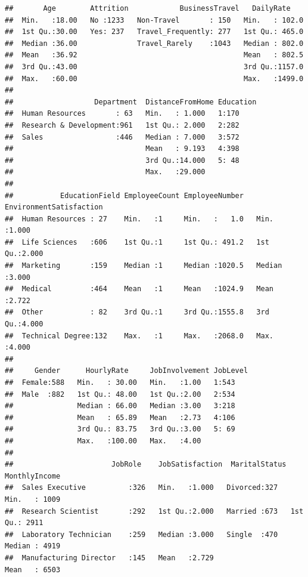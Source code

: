 \documentclass[
]{article}
\begin{document}
\begin{verbatim}
##       Age        Attrition            BusinessTravel   DailyRate     
##  Min.   :18.00   No :1233   Non-Travel       : 150   Min.   : 102.0  
##  1st Qu.:30.00   Yes: 237   Travel_Frequently: 277   1st Qu.: 465.0  
##  Median :36.00              Travel_Rarely    :1043   Median : 802.0  
##  Mean   :36.92                                       Mean   : 802.5  
##  3rd Qu.:43.00                                       3rd Qu.:1157.0  
##  Max.   :60.00                                       Max.   :1499.0  
##                                                                      
##                   Department  DistanceFromHome Education
##  Human Resources       : 63   Min.   : 1.000   1:170    
##  Research & Development:961   1st Qu.: 2.000   2:282    
##  Sales                 :446   Median : 7.000   3:572    
##                               Mean   : 9.193   4:398    
##                               3rd Qu.:14.000   5: 48    
##                               Max.   :29.000            
##                                                         
##           EducationField EmployeeCount EmployeeNumber   EnvironmentSatisfaction
##  Human Resources : 27    Min.   :1     Min.   :   1.0   Min.   :1.000          
##  Life Sciences   :606    1st Qu.:1     1st Qu.: 491.2   1st Qu.:2.000          
##  Marketing       :159    Median :1     Median :1020.5   Median :3.000          
##  Medical         :464    Mean   :1     Mean   :1024.9   Mean   :2.722          
##  Other           : 82    3rd Qu.:1     3rd Qu.:1555.8   3rd Qu.:4.000          
##  Technical Degree:132    Max.   :1     Max.   :2068.0   Max.   :4.000          
##                                                                                
##     Gender      HourlyRate     JobInvolvement JobLevel
##  Female:588   Min.   : 30.00   Min.   :1.00   1:543   
##  Male  :882   1st Qu.: 48.00   1st Qu.:2.00   2:534   
##               Median : 66.00   Median :3.00   3:218   
##               Mean   : 65.89   Mean   :2.73   4:106   
##               3rd Qu.: 83.75   3rd Qu.:3.00   5: 69   
##               Max.   :100.00   Max.   :4.00           
##                                                       
##                       JobRole    JobSatisfaction  MaritalStatus MonthlyIncome  
##  Sales Executive          :326   Min.   :1.000   Divorced:327   Min.   : 1009  
##  Research Scientist       :292   1st Qu.:2.000   Married :673   1st Qu.: 2911  
##  Laboratory Technician    :259   Median :3.000   Single  :470   Median : 4919  
##  Manufacturing Director   :145   Mean   :2.729                  Mean   : 6503  

\end{verbatim}
\end{document}
